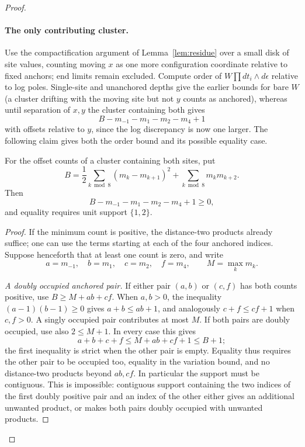 \begin{proof}
\paragraph{The only contributing cluster.}
Use the compactification argument of Lemma~\ref{lem:residue} over a small disk of site values, counting moving \(x\) as one more configuration coordinate relative to fixed anchors; end limits remain excluded. Compute order of \(W\prod dt_i\wedge d\epsilon\) relative to log poles. Single-site and unanchored depths give the earlier bounds for bare \(W\) (a cluster drifting with the moving site but not \(y\) counts as anchored), whereas until separation of \(x,y\) the cluster containing both gives
\[
 B-m_{-1}-m_1-m_2-m_4+1
\]
with offsets relative to $y$, since the log discrepancy is now one larger. The following claim gives both the order bound and its possible equality case.

\begin{claim}\label{claim:merging-site-order}
For the offset counts of a cluster containing both sites, put
\[
 B=\frac12\sum_{k\bmod8}(m_k-m_{k+1})^2
       +\sum_{k\bmod8}m_km_{k+2}.
\]
Then
\[
 B-m_{-1}-m_1-m_2-m_4+1\ge0,
\]
and equality requires unit support $\{1,2\}$.
\end{claim}

\begin{proof}
If the minimum count is positive, the distance-two products already suffice; one can use the terms starting at each of the four anchored indices. Suppose henceforth that at least one count is zero, and write
\[
 a=m_{-1},\quad b=m_1,\quad c=m_2,\quad f=m_4,
 \qquad M=\max_k m_k.
\]

\emph{A doubly occupied anchored pair.}
If either pair $(a,b)$ or $(c,f)$ has both counts positive, use $B\ge M+ab+cf$. When $a,b>0$, the inequality $(a-1)(b-1)\ge0$ gives $a+b\le ab+1$, and analogously $c+f\le cf+1$ when $c,f>0$. A singly occupied pair contributes at most $M$. If both pairs are doubly occupied, use also $2\le M+1$. In every case this gives
\[
 a+b+c+f\le M+ab+cf+1\le B+1;
\]
the first inequality is strict when the other pair is empty. Equality thus requires the other pair to be occupied too, equality in the variation bound, and no distance-two products beyond $ab,cf$. In particular the support must be contiguous. This is impossible: contiguous support containing the two indices of the first doubly positive pair and an index of the other either gives an additional unwanted product, or makes both pairs doubly occupied with unwanted products.


\end{proof}
\end{proof}
